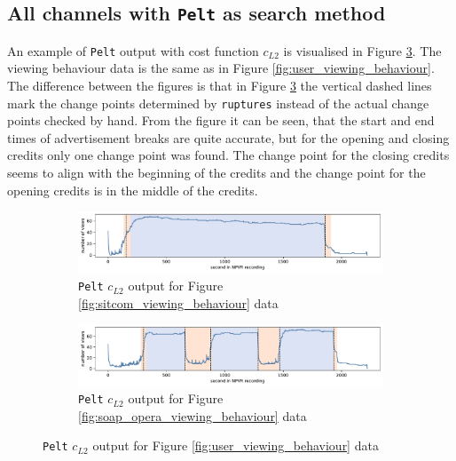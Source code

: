\subsection{All channels with \texttt{Pelt} as search method} \label{sec:results_pelt}

An example of \texttt{Pelt} output with cost function $c_{L2}$ is visualised in Figure \ref{fig:ruptures_change_detection}. The viewing behaviour data is the same as in Figure \ref{fig:user_viewing_behaviour}. The difference between the figures is that in Figure \ref{fig:ruptures_change_detection} the vertical dashed lines mark the change points determined by \texttt{ruptures} instead of the actual change points checked by hand. From the figure it can be seen, that the start and end times of advertisement breaks are quite accurate, but for the opening and closing credits only one change point was found. The change point for the closing credits seems to align with the beginning of the credits and the change point for the opening credits is in the middle of the credits.

\begin{figure}[H]
    \par\bigskip
    \centering
    \begin{subfigure}[b]{\textwidth}
       \includegraphics[width=1\textwidth]{../plots/sitcom-pelt_l2_pen30000.pdf}
       \caption{\texttt{Pelt} $c_{L2}$ output for Figure \ref{fig:sitcom_viewing_behaviour} data}
       \label{fig:pelt_sitcom} 
    \end{subfigure}
    \par\bigskip
    \begin{subfigure}[b]{\textwidth}
       \includegraphics[width=1\textwidth]{../plots/soap_opera-pelt_l2_pen30000.pdf}
       \caption{\texttt{Pelt} $c_{L2}$ output for Figure \ref{fig:soap_opera_viewing_behaviour} data}
       \label{fig:pelt_soap_opera}
    \end{subfigure}
    \caption{\texttt{Pelt} $c_{L2}$ output for Figure \ref{fig:user_viewing_behaviour} data}
    \label{fig:ruptures_change_detection}
\end{figure} 

